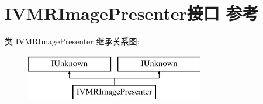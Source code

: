 \hypertarget{interface_i_v_m_r_image_presenter}{}\section{I\+V\+M\+R\+Image\+Presenter接口 参考}
\label{interface_i_v_m_r_image_presenter}
类 I\+V\+M\+R\+Image\+Presenter 继承关系图\+:\begin{figure}[H]
\begin{center}
\leavevmode
\includegraphics[height=2.000000cm]{interface_i_v_m_r_image_presenter}
\end{center}
\end{figure}
